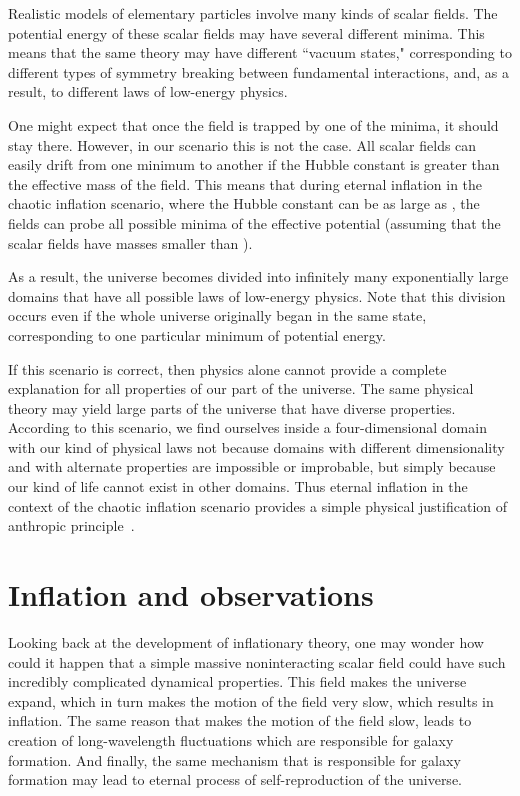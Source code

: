 \documentclass[a4paper,12pt]{article}
\begin{document}
Realistic models of elementary particles involve many kinds
of scalar fields. 
The potential energy of these scalar fields may have several different
minima. This means that the same theory may have different ``vacuum
states," corresponding to different types of symmetry breaking between
fundamental interactions, and, as a result, to different laws of
low-energy physics.

One might expect that once the field is trapped by one of the minima, it should stay there. However, in our scenario this is not the case. All scalar fields can easily drift from one minimum to another if the Hubble constant \coordHE{} is greater than the effective mass of the field. This means that during eternal inflation in the chaotic inflation scenario, where the Hubble constant can be as large as \coordHE{}, the fields can probe all possible minima of the effective potential (assuming that the scalar fields have masses smaller than \coordHE{}).


    As a result, the universe  becomes divided into infinitely many exponentially large domains that have all possible  laws of low-energy physics. Note that this
division occurs even if the whole universe originally began in the same
state, corresponding to one particular minimum of potential energy.
 

If this scenario is correct, then physics alone cannot provide a complete
explanation for all properties of our part of the universe.   The same
physical theory may yield large parts of the universe that have diverse
properties.  According to this scenario, we find ourselves inside a
four-dimensional domain with our kind of physical laws not because
domains with different dimensionality and with alternate properties are
impossible or improbable, but simply because our kind of life cannot
exist in other domains. Thus eternal inflation in the context of the chaotic inflation scenario provides a simple physical justification of anthropic principle~\cite{Eternal,book}.



\section{Inflation and observations}
Looking back at the development of inflationary theory, one may wonder how could it happen that  a simple  massive noninteracting scalar field \myHighlight{$\phi$}\coordHE{} could have such incredibly complicated dynamical properties. This field makes the universe expand, which in turn makes the motion of the field very slow, which results in inflation. The same reason that makes the motion of the field slow, leads to creation of long-wavelength fluctuations which are responsible for galaxy formation. And finally, the same mechanism that is responsible for galaxy formation may lead to eternal process of self-reproduction of the universe. 
\end{document}

